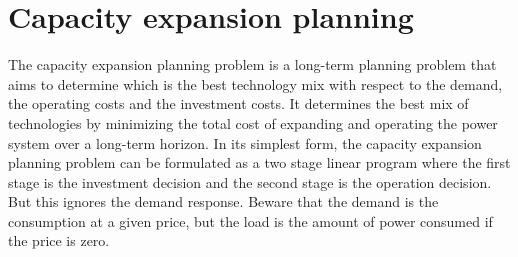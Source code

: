 \documentclass[12pt, openany]{report}
\theoremstyle{definition}
\begin{document}
\section{Capacity expansion planning}
The capacity expansion planning problem is a long-term planning problem that aims to determine which is the best technology mix with respect to the demand, the operating costs and the investment costs. It determines the best mix of technologies by minimizing the total cost of expanding and operating the power system over a long-term horizon. In its simplest form, the capacity expansion planning problem can be formulated as a two stage linear program where the first stage is the investment decision and the second stage is the operation decision. But this ignores the demand response. Beware that the demand is the consumption at a given price, but the load is the amount of power consumed if the price is zero. 
\end{document}
